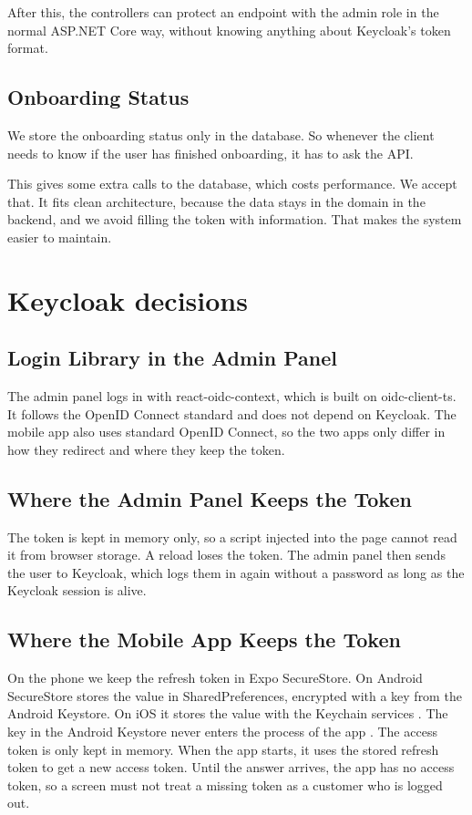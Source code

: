 \documentclass[a4paper,11pt]{article}
\begin{document}
After this, the controllers can protect an endpoint with the admin role in the normal ASP.NET Core way, without knowing anything about Keycloak's token format.

\subsection{Onboarding Status}
We store the onboarding status only in the database. So whenever the client needs to know if the user has finished onboarding, it has to ask the API.

This gives some extra calls to the database, which costs performance. We accept that. It fits clean architecture, because the data stays in the domain in the backend, and we avoid filling the token with information. That makes the system easier to maintain.

\section{Keycloak decisions}

\subsection{Login Library in the Admin Panel}
The admin panel logs in with react-oidc-context, which is built on oidc-client-ts. It follows the OpenID Connect standard and does not depend on Keycloak. The mobile app also uses standard OpenID Connect, so the two apps only differ in how they redirect and where they keep the token.

\subsection{Where the Admin Panel Keeps the Token}
The token is kept in memory only, so a script injected into the page cannot read it from browser storage. A reload loses the token. The admin panel then sends the user to Keycloak, which logs them in again without a password as long as the Keycloak session is alive.

\subsection{Where the Mobile App Keeps the Token}
On the phone we keep the refresh token in Expo SecureStore. On Android SecureStore stores the value in SharedPreferences, encrypted with a key from the Android Keystore. On iOS it stores the value with the Keychain services \cite{expo-securestore}. The key in the Android Keystore never enters the process of the app \cite{android-keystore}. The access token is only kept in memory. When the app starts, it uses the stored refresh token to get a new access token. Until the answer arrives, the app has no access token, so a screen must not treat a missing token as a customer who is logged out.
\end{document}
